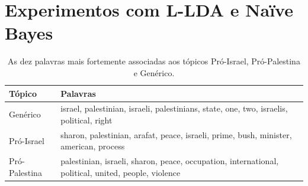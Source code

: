 


\section{Experimentos com L-LDA e Naïve Bayes}

\begin{table}[h]
\centering
\begin{tabular}{| l | p{10cm} | }
\hline
Tópico & Palavras \\ \hline
Genérico & israel, palestinian, israeli, palestinians, state, one, two, israelis, political, right \\ \hline
Pró-Israel & sharon, palestinian, arafat, peace, israeli, prime, bush, minister, american, process \\ \hline
Pró-Palestina & palestinian, israeli, sharon, peace, occupation, international, political, united, people, violence \\ \hline
\end{tabular}
\label{1}
\caption{As dez palavras mais fortemente associadas aos tópicos Pró-Israel, Pró-Palestina e Genérico.}
\end{table}


